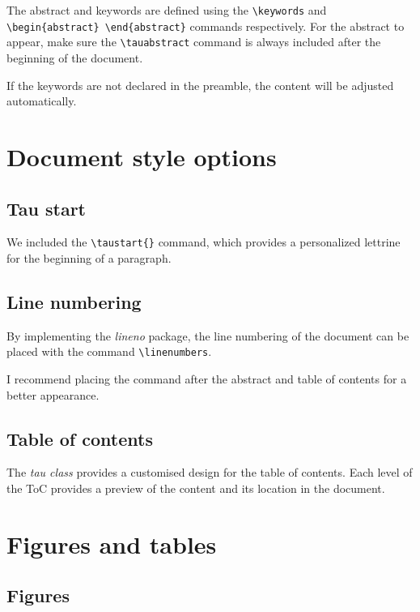 \documentclass[9pt,a4paper,twoside]{tau-class/tau}
\begin{document}
    The abstract and keywords are defined using the \verb*|\keywords| and \verb*|\begin{abstract} \end{abstract}| commands respectively. For the abstract to appear, make sure the \verb|\tauabstract| command is always included after the beginning of the document.
    
    If the keywords are not declared in the preamble, the content will be adjusted automatically.
    
\section{Document style options}

    \subsection{Tau start}
	
        We included the \verb|\taustart{}| command, which provides a personalized lettrine for the beginning of a paragraph.

    \subsection{Line numbering}
	
        By implementing the \textit{lineno} package, the line numbering of the document can be placed with the command \verb|\linenumbers|.
		
        I recommend placing the command after the abstract and table of contents for a better appearance.
		
    \subsection{Table of contents}
	
        The \textit{tau class} provides a customised design for the table of contents. Each level of the ToC provides a preview of the content and its location in the document. 
		
\section{Figures and tables}

    \subsection{Figures}
		
\end{document}
